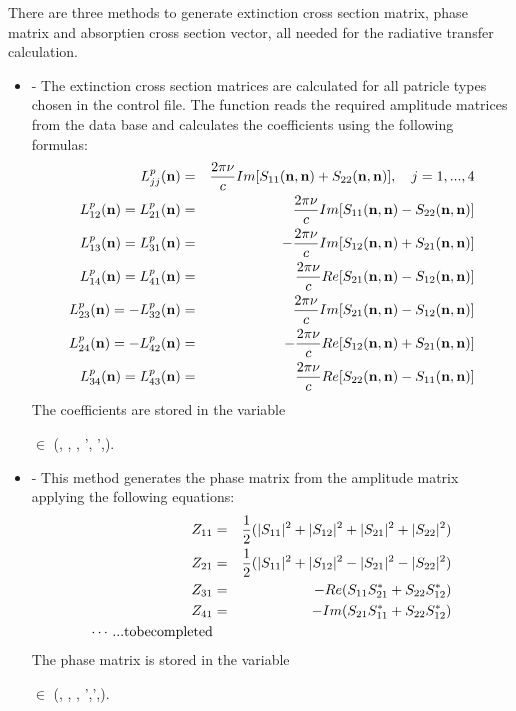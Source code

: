 There are three methods to generate extinction cross section
matrix, phase matrix and absorptien cross section vector, all needed for the
radiative transfer calculation. 
\begin{itemize}
\item  {} - The extinction cross section
  matrices \SExMat are
  calculated for all patricle types chosen in the control
  file. The function reads the
  required amplitude matrices \AmpMat from the 
  data base and calculates the coefficients using the following
  formulas:
  \begin{eqnarray}
    \label{eq:gen_ext_matrix}
    L^p_{jj}({\bf n}) &=& \frac{2\pi \nu}{c} Im[S_{11}({\bf n},{\bf
      n})+S_{22}({\bf n},{\bf n})], \quad j=1,...,4 \\
    L^p_{12}({\bf n}) = L^p_{21}({\bf n}) &=& \frac{2\pi \nu}{c} Im[S_{11}({\bf n},{\bf
      n})-S_{22}({\bf n},{\bf n})]\\
    L^p_{13}({\bf n}) = L^p_{31}({\bf n}) &=& -\frac{2\pi \nu}{c} Im[S_{12}({\bf n},{\bf
      n})+S_{21}({\bf n},{\bf n})]\\
    L^p_{14}({\bf n}) = L^p_{41}({\bf n}) &=& \frac{2\pi \nu}{c} Re[S_{21}({\bf n},{\bf
      n})-S_{12}({\bf n},{\bf n})]\\
    L^p_{23}({\bf n}) = -L^p_{32}({\bf n}) &=& \frac{2\pi \nu}{c} Im[S_{21}({\bf n},{\bf
      n})-S_{12}({\bf n},{\bf n})]\\
    L^p_{24}({\bf n}) = -L^p_{42}({\bf n}) &=& -\frac{2\pi \nu}{c} Re[S_{12}({\bf n},{\bf
      n})+S_{21}({\bf n},{\bf n})]\\
    L^p_{34}({\bf n}) = L^p_{43}({\bf n}) &=& \frac{2\pi \nu}{c} Re[S_{22}({\bf n},{\bf
      n})-S_{11}({\bf n},{\bf n})]
  \end{eqnarray}
  The coefficients are stored in the variable
  \begin{center}
  $\in$ (\IPart, \ScaZa, \ScaAa, \ScaZa', \ScaAa',).   
  \end{center}

\item {} - This method generates the
  phase matrix \PhaMat from the amplitude matrix \AmpMat applying the following
  equations:
\begin{eqnarray}
 \label{eq:gen_phase_matrix}
   Z_{11} &=& \frac{1}{2}(|S_{11}|^2+|S_{12}|^2+|S_{21}|^2+|S_{22}|^2)\\
   Z_{21} &=& \frac{1}{2}(|S_{11}|^2+|S_{12}|^2-|S_{21}|^2-|S_{22}|^2)\\
   Z_{31} &=& -Re(S_{11}S_{21}^*+S_{22}S_{12}^*)\\
   Z_{41} &=& -Im(S_{21}S_{11}^*+S_{22}S_{12}^*)\\
\cdots ... {\rm to be completed}
\end{eqnarray}
The phase matrix is stored in the
variable\\ 
\begin{center}
   $\in$ (\IPart, \ScaZa, \ScaAa,
  \ScaZa',\ScaAa',).
\end{center}


\end{itemize}

